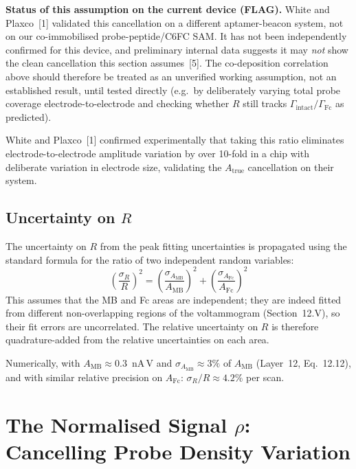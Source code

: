 \documentclass[10pt,a4paper]{article}
\numberwithin{equation}{section}
\newcommand{\cit}[1]{[#1]}
\newcommand{\AMB}{A_{\text{MB}}}
\newcommand{\AFc}{A_{\text{Fc}}}
\newcommand{\Gtot}{\Gamma_{\text{intact}}}
\begin{document}
\textbf{Status of this assumption on the current device (FLAG).} White and
Plaxco~\cit{1} validated this cancellation on a different aptamer-beacon
system, not on our co-immobilised probe-peptide/C6FC SAM. It has not been
independently confirmed for this device, and preliminary internal data
suggests it may \emph{not} show the clean cancellation this section
assumes~\cit{5}. The co-deposition correlation above should therefore be
treated as an unverified working assumption, not an established result,
until tested directly (e.g.\ by deliberately varying total probe coverage
electrode-to-electrode and checking whether $R$ still tracks
$\Gtot/\Gamma_\text{Fc}$ as predicted).

White and Plaxco~\cit{1} confirmed experimentally that taking this ratio
eliminates electrode-to-electrode amplitude variation by over 10-fold
in a chip with deliberate variation in electrode size, validating the
$A_\text{true}$ cancellation on their system.

\subsection{Uncertainty on $R$}

The uncertainty on $R$ from the peak fitting uncertainties is propagated
using the standard formula for the ratio of two independent random variables:
\begin{equation}
  \left(\frac{\sigma_R}{R}\right)^2 =
  \left(\frac{\sigma_{\AMB}}{\AMB}\right)^2 +
  \left(\frac{\sigma_{\AFc}}{\AFc}\right)^2
  \label{eq:sigR}
\end{equation}
This assumes that the MB and Fc areas are independent; they are indeed fitted
from different non-overlapping regions of the voltammogram (Section~12.V),
so their fit errors are uncorrelated. The relative uncertainty on $R$ is
therefore quadrature-added from the relative uncertainties on each area.

Numerically, with $\AMB \approx 0.3$~nA\,V and $\sigma_{\AMB} \approx 3\%$
of $\AMB$ (Layer~12, Eq.~12.12), and with similar relative precision on
$\AFc$: $\sigma_R/R \approx 4.2\%$ per scan.

\section{The Normalised Signal $\rho$: Cancelling Probe Density Variation}
\label{sec:rho}
\end{document}
